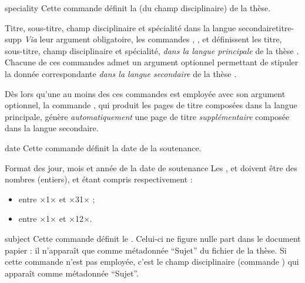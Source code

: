 %
\begin{docCommand}{speciality}{}
  Cette commande définit la  (du champ
  disciplinaire) de la thèse.
\end{docCommand}
%
\begin{dbremark}{Titre, sous-titre, champ disciplinaire et spécialité dans la
    langue secondaire}{titre-supp}
  \emph{Via} leur argument obligatoire, les commandes ,
  ,  et  définissent
  les titre, sous-titre, champ disciplinaire et spécialité, \emph{dans la
    langue principale} de la thèse . Chacune de
  ces commandes admet un argument optionnel permettant de stipuler la donnée
  correspondante \emph{dans la langue secondaire} de la thèse .

  Dès lors qu'une au moins des ces commandes est employée avec son argument
  optionnel, la commande , qui produit les pages de titre
  composées dans la langue principale, génère \emph{automatiquement} une page
  de titre \emph{supplémentaire} composée dans la langue secondaire.
\end{dbremark}
%
\begin{docCommand}[doc description=\mandatory]{date}{}
  Cette commande définit la date de la soutenance.
  \begin{dbwarning}{Format des jour, mois et année de la date de
      soutenance}{}
    Les ,  et  doivent être des nombres
    (entiers),  et  étant compris respectivement :
    \begin{itemize}
    \item entre ×1× et ×31× ;
    \item entre ×1× et ×12×.
    \end{itemize}
  \end{dbwarning}
\end{docCommand}
%
\begin{docCommand}{subject}{}
  Cette commande définit le .  Celui-ci ne figure nulle
  part dans le document papier : il n'apparaît que comme métadonnée
  \enquote{Sujet} du fichier \pdf de la thèse. Si cette commande n'est pas
  employée, c'est le champ disciplinaire (commande ) qui
  apparaît comme métadonnée \enquote{Sujet}.
\end{docCommand}


